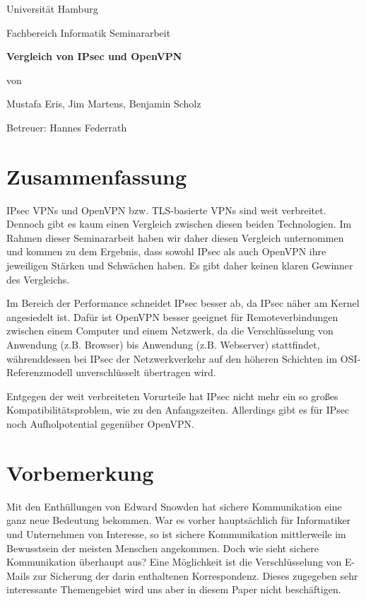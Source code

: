 \documentclass[12pt]{scrartcl}
\begin{document}

\newpage
\thispagestyle{empty}
\begin{center}\Large
Universität Hamburg \par
Fachbereich Informatik
\vfill
Seminararbeit
\vfill
{\Large\textsf{\textbf{Vergleich von IPsec und OpenVPN}}\par}
\vfill
von 
\par\bigskip
Mustafa Eris, Jim Martens, Benjamin Scholz \par
Betreuer: Hannes Federrath \par
\end{center}

\newpage
\section*{Zusammenfassung}
IPsec VPNs und OpenVPN bzw. TLS-basierte VPNs sind weit verbreitet. Dennoch gibt es kaum einen Vergleich zwischen diesen beiden Technologien. Im Rahmen dieser Seminararbeit haben wir daher diesen Vergleich unternommen und kommen zu dem Ergebnis, dass sowohl IPsec als auch OpenVPN ihre jeweiligen Stärken und Schwächen haben. Es gibt daher keinen klaren Gewinner des Vergleichs.

Im Bereich der Performance schneidet IPsec besser ab, da IPsec näher am Kernel angesiedelt ist. Dafür ist OpenVPN besser geeignet für Remoteverbindungen zwischen einem Computer und einem Netzwerk, da die Verschlüsselung von Anwendung (z.B. Browser) bis Anwendung (z.B. Webserver) stattfindet, währenddessen bei IPsec der Netzwerkverkehr auf den höheren Schichten im OSI-Referenzmodell unverschlüsselt übertragen wird. 

Entgegen der weit verbreiteten Vorurteile hat IPsec nicht mehr ein so großes Kompatibilitätsproblem, wie zu den Anfangszeiten. Allerdings gibt es für IPsec noch Aufholpotential gegenüber OpenVPN.

\newpage
\tableofcontents

\newpage
\section{Vorbemerkung}
Mit den Enthüllungen von Edward Snowden hat sichere Kommunikation eine ganz neue Bedeutung bekommen. War es vorher hauptsächlich für Informatiker und Unternehmen von Interesse, so ist sichere Kommunikation mittlerweile im Bewusstsein der meisten Menschen angekommen. Doch wie sieht sichere Kommunikation überhaupt aus? Eine Möglichkeit ist die Verschlüsselung von E-Mails zur Sicherung der darin enthaltenen Korrespondenz. Dieses zugegeben sehr interessante Themengebiet wird uns aber in diesem Paper nicht beschäftigen. 
\end{document}
